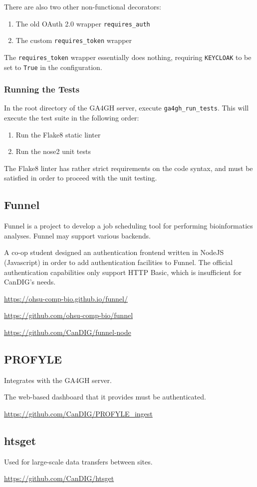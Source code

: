 \documentclass{article}
\begin{document}
There are also two other non-functional decorators:
\begin{enumerate}
\item The old OAuth 2.0 wrapper \texttt{requires\_auth}
\item The custom \texttt{requires\_token} wrapper
\end{enumerate}

The \texttt{requires\_token} wrapper essentially does nothing, 
requiring \texttt{KEYCLOAK} to be set to \texttt{True} in the configuration.

\subsubsection{Running the Tests}

In the root directory of the GA4GH server, execute \texttt{ga4gh\_run\_tests}.
This will execute the test suite in the following order:
\begin{enumerate}
\item Run the Flake8 static linter
\item Run the nose2 unit tests
\end{enumerate}

The Flake8 linter has rather strict requirements on the code syntax,
and must be satisfied in order to proceed with the unit testing.



\subsection{Funnel}

Funnel is a project to develop a job scheduling tool for performing
bioinformatics analyses. Funnel may support various backends.

A co-op student designed an authentication frontend written in NodeJS (Javascript)  in order to add authentication facilities to Funnel. The official authentication capabilities only support HTTP Basic, which is insufficient for CanDIG's needs.

\url{https://ohsu-comp-bio.github.io/funnel/}

\url{https://github.com/ohsu-comp-bio/funnel}

\url{https://github.com/CanDIG/funnel-node}

\subsection{PROFYLE}

Integrates with the GA4GH server.

The web-based dashboard that it provides must be authenticated.

\url{https://github.com/CanDIG/PROFYLE_ingest}


\subsection{htsget}

Used for large-scale data transfers between sites.

\url{https://github.com/CanDIG/htsget}
\end{document}
